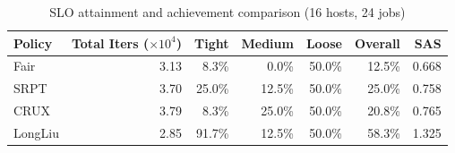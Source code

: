 \begin{table}[t]
\centering
\caption{SLO attainment and achievement comparison (16 hosts, 24 jobs)}
\label{tab:slo_16host}
\begin{tabular}{l|r|r|r|r|r|r}
\hline
Policy & Total Iters ($\times 10^4$) & Tight & Medium & Loose & Overall & SAS \\
\hline
Fair & 3.13 & 8.3\% & 0.0\% & 50.0\% & 12.5\% & 0.668 \\
SRPT & 3.70 & 25.0\% & 12.5\% & 50.0\% & 25.0\% & 0.758 \\
CRUX & 3.79 & 8.3\% & 25.0\% & 50.0\% & 20.8\% & 0.765 \\
LongLiu & 2.85 & 91.7\% & 12.5\% & 50.0\% & 58.3\% & 1.325 \\
\hline
\end{tabular}
\end{table}
